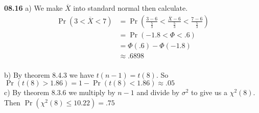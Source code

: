 

{\bf 08.16} a) We make $\overline{X}$ into standard normal then calculate. \\
\begin{align*}
	\Pr \left( 3 < \overline{X} < 7 \right) & = 
		\Pr \left( \frac{3 - 6}{\frac{5}{3}} < \frac{\overline{X} - 6}{\frac{5}{3}} < \frac{7 - 6}{\frac{5}{3}} \right) \\
	& = \Pr \left( -1.8 < \Phi < .6 \right) \\
	& = \Phi ( .6 ) - \Phi (-1.8) \\
	& \approx .6898 \\
\end{align*} 

b) By theorem 8.4.3 we have $t(n-1) = t(8)$. So $\Pr ( t(8) > 1.86) = 1 - \Pr (t(8) < 1.86) \approx .05$ \\

c) By theorem 8.3.6 we multiply by $n-1$ and divide by $\sigma^2$ to give us a $\chi^2 (8)$. Then
$\Pr ( \chi^2 (8) \leq 10.22 ) = .75$ \\


